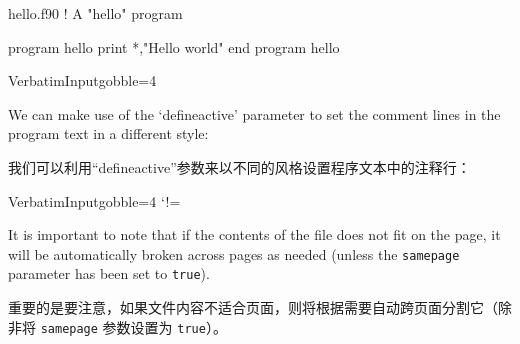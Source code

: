 \documentclass[twoside]{article}
\newcommand\cs[1]{\texttt{\textbackslash#1}}
\newcommand\verbatimTxt{抄录}
\begin{document}
%   \cs{VerbatimInput}命令 (变种 \cs{BVerbatimInput}、


\typeout{*************************************}
\typeout{*************************************}

\begin{VerbatimOut}{hello.f90}
  ! A "hello" program

  program hello
    print *,"Hello world"
  end program hello
\end{VerbatimOut}

\begin{SideBySideExample}
  \RecustomVerbatimCommand{\VerbatimInput}
  {VerbatimInput}{gobble=4}



\end{SideBySideExample}

We can make use of the `defineactive' parameter to set the comment lines
in the program text in a different style:

我们可以利用“defineactive”参数来以不同的风格设置程序文本中的注释行：


\begin{SideBySideExample}
  \RecustomVerbatimCommand{\VerbatimInput}
  {VerbatimInput}{gobble=4}
  \def\ExclamationPoint{\char33}
  \catcode`!=\active
  \VerbatimInput%
    [defineactive=%
      \def!{\color{cyan}\itshape
        \ExclamationPoint}]
    {hello.f90}
\end{SideBySideExample}

It is important to note that if the contents of the file does not fit on
the page, it will be automatically broken across pages as needed (unless the
\texttt{samepage} parameter has been set to \texttt{true}).

重要的是要注意，如果文件内容不适合页面，则将根据需要自动跨页面分割它（除非将 \texttt{samepage} 参数设置为 \texttt{true}）。
\end{document}
